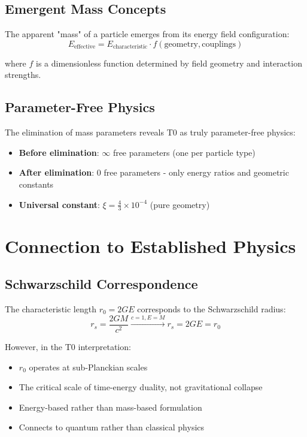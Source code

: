 \documentclass[12pt,a4paper]{report}
\newcommand{\rzero}{r_0}                  %
\begin{document}
	\subsection{Emergent Mass Concepts}
	\label{subsec:emergent_mass}
	
	The apparent "mass" of a particle emerges from its energy field configuration:
	\begin{equation}
		E_{\text{effective}} = E_{\text{characteristic}} \cdot f(\text{geometry}, \text{couplings})
	\end{equation}
	
	where $f$ is a dimensionless function determined by field geometry and interaction strengths.
	
	\subsection{Parameter-Free Physics}
	\label{subsec:parameter_free}
	
	The elimination of mass parameters reveals T0 as truly parameter-free physics:
	\begin{itemize}
		\item \textbf{Before elimination}: $\infty$ free parameters (one per particle type)
		\item \textbf{After elimination}: 0 free parameters - only energy ratios and geometric constants
		\item \textbf{Universal constant}: $\xi = \frac{4}{3} \times 10^{-4}$ (pure geometry)
	\end{itemize}
	
	\section{Connection to Established Physics}
	\label{sec:connection_established}
	
	\subsection{Schwarzschild Correspondence}
	\label{subsec:schwarzschild_correspondence}
	
	The characteristic length $\rzero = 2GE$ corresponds to the Schwarzschild radius:
	\begin{equation}
		r_s = \frac{2GM}{c^2} \xrightarrow{c=1, E=M} r_s = 2GE = \rzero
	\end{equation}
	
	However, in the T0 interpretation:
	\begin{itemize}
		\item $\rzero$ operates at sub-Planckian scales
		\item The critical scale of time-energy duality, not gravitational collapse
		\item Energy-based rather than mass-based formulation
		\item Connects to quantum rather than classical physics
	\end{itemize}
	
\end{document}
